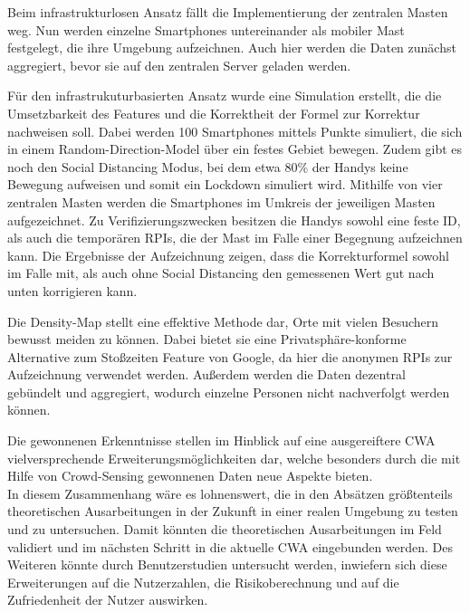 \documentclass[conference,compsoc]{IEEEtran}
\begin{document}
Beim infrastrukturlosen Ansatz fällt die Implementierung der zentralen Masten weg. 
Nun werden einzelne Smartphones untereinander als mobiler Mast festgelegt, die ihre Umgebung aufzeichnen.
Auch hier werden die Daten zunächst aggregiert, bevor sie auf den zentralen Server geladen werden.

Für den infrastrukuturbasierten Ansatz wurde eine Simulation erstellt, die die Umsetzbarkeit des Features und die Korrektheit der Formel zur Korrektur nachweisen soll. 
Dabei werden 100 Smartphones mittels Punkte simuliert, die sich in einem Random-Direction-Model über ein festes Gebiet bewegen. 
Zudem gibt es noch den \glqq Social Distancing \grqq{} Modus, bei dem etwa 80\% der Handys keine Bewegung aufweisen und somit ein Lockdown simuliert wird.
Mithilfe von vier zentralen Masten werden die Smartphones im Umkreis der jeweiligen Masten aufgezeichnet. 
Zu Verifizierungszwecken besitzen die Handys sowohl eine feste ID, als auch die temporären RPIs, die der Mast im Falle einer Begegnung aufzeichnen kann. 
Die Ergebnisse der Aufzeichnung zeigen, dass die Korrekturformel sowohl im Falle mit, als auch ohne Social Distancing den gemessenen Wert gut nach unten korrigieren kann. 

Die Density-Map stellt eine effektive Methode dar, Orte mit vielen Besuchern bewusst meiden zu können.
Dabei bietet sie eine Privatsphäre-konforme Alternative zum Stoßzeiten Feature von Google, da hier die anonymen RPIs zur Aufzeichnung verwendet werden. 
Außerdem werden die Daten dezentral gebündelt und aggregiert, wodurch einzelne Personen nicht nachverfolgt werden können. 

Die gewonnenen Erkenntnisse stellen im Hinblick auf eine ausgereiftere CWA vielversprechende Erweiterungsmöglichkeiten dar, welche besonders durch die mit Hilfe von Crowd-Sensing gewonnenen Daten neue Aspekte bieten.\\
In diesem Zusammenhang wäre es lohnenswert, die in den Absätzen größtenteils theoretischen Ausarbeitungen in der Zukunft in einer realen Umgebung zu testen und zu untersuchen. 
Damit könnten die theoretischen Ausarbeitungen im Feld validiert und im nächsten Schritt in die aktuelle CWA eingebunden werden.
Des Weiteren könnte durch Benutzerstudien untersucht werden, inwiefern sich diese Erweiterungen auf die Nutzerzahlen, die Risikoberechnung und auf die Zufriedenheit der Nutzer auswirken. 
\end{document}
